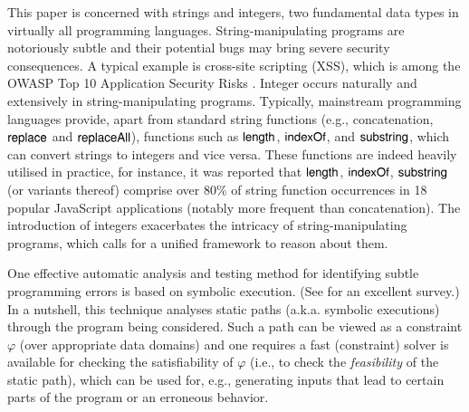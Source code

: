 

This paper is concerned with strings and integers, two fundamental data types in virtually all programming languages.
String-manipulating programs are notoriously subtle and their potential bugs %
may bring severe security consequences. A typical example is cross-site scripting
(XSS), which is among the OWASP Top 10 Application Security Risks
\cite{owasp17}. Integer occurs naturally and extensively in string-manipulating programs. %
Typically, mainstream programming languages provide, apart from standard string functions (e.g., concatenation, $\mathsf{replace}$ and $\mathsf{replaceAll}$), %
functions such as $\mathsf{length}$, $\mathsf{indexOf}$, and $\mathsf{substring}$, which can convert strings to integers and vice versa. %
These functions are indeed heavily utilised in practice, for instance, it was reported \cite{Berkeley-JavaScript} that $\mathsf{length}$, $\mathsf{indexOf}$, $\mathsf{substring}$ (or variants thereof) comprise over 80\% of string function occurrences in 18 popular JavaScript applications (notably more frequent than concatenation). The introduction of integers exacerbates the intricacy of string-manipulating programs, which calls for a unified framework to reason about them. 



One effective automatic analysis and testing method for identifying subtle programming errors is based on symbolic execution.
(See \cite{symbex-survey} for an excellent survey.)
In a nutshell, this technique analyses static paths
(a.k.a. symbolic executions) through the program being considered. %
Such a path can be viewed as a constraint $\varphi$ (over
appropriate data domains) and one requires a fast (constraint)
solver is available for checking the satisfiability of $\varphi$ (i.e., to check
the \emph{feasibility} of the static path), which can be used for, e.g.,  generating
inputs that lead to certain parts of the program or an erroneous behavior.



